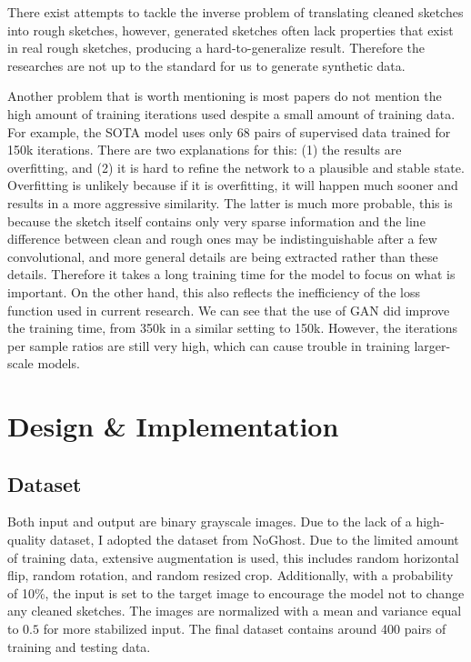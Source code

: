 There exist attempts to tackle the inverse problem of translating cleaned sketches into rough sketches, however, generated sketches often lack properties that exist in real rough sketches, producing a hard-to-generalize result\cite{simo-serraMasteringSketchingAdversarial2017}. Therefore the researches are not up to the standard for us to generate synthetic data.

Another problem that is worth mentioning is most papers do not mention the high amount of training iterations used despite a small amount of training data. For example, the SOTA model\cite{simo-serraMasteringSketchingAdversarial2017} uses only 68 pairs of supervised data trained for 150k iterations. There are two explanations for this: (1) the results are overfitting, and (2) it is hard to refine the network to a plausible and stable state. Overfitting is unlikely because if it is overfitting, it will happen much sooner and results in a more aggressive similarity. The latter is much more probable, this is because the sketch itself contains only very sparse information and the line difference between clean and rough ones may be indistinguishable after a few convolutional, and more general details are being extracted rather than these details. Therefore it takes a long training time for the model to focus on what is important. On the other hand, this also reflects the inefficiency of the loss function used in current research. We can see that the use of GAN did improve the training time, from 350k\cite{simo-serraLearningSimplifyFully2016} in a similar setting to 150k\cite{simo-serraMasteringSketchingAdversarial2017}. However, the iterations per sample ratios are still very high, which can cause trouble in training larger-scale models.

\section{Design \& Implementation}
\subsection{Dataset}
Both input and output are binary grayscale images. Due to the lack of a high-quality dataset, I adopted the dataset from NoGhost. Due to the limited amount of training data, extensive augmentation is used, this includes random horizontal flip, random rotation, and random resized crop. Additionally, with a probability of 10\%, the input is set to the target image to encourage the model not to change any cleaned sketches. The images are normalized with a mean and variance equal to $0.5$ for more stabilized input. The final dataset contains around 400 pairs of training and testing data.

